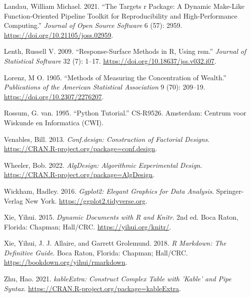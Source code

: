 \documentclass{article}
\newlength{\cslhangindent}
\newlength{\cslentryspacingunit} %
\newenvironment{CSLReferences}[2] %
 {%
  \setlength{\parindent}{0pt}
  \ifodd #1
  \let\oldpar\par
  \def\par{\hangindent=\cslhangindent\oldpar}
  \fi
  \setlength{\parskip}{#2\cslentryspacingunit}
 }%
 {}
\begin{document}
\begin{CSLReferences}{1}{0}
\leavevmode{}%
Landau, William Michael. 2021. {``The Targets r Package: A Dynamic
Make-Like Function-Oriented Pipeline Toolkit for Reproducibility and
High-Performance Computing.''} \emph{Journal of Open Source Software} 6
(57): 2959. \url{https://doi.org/10.21105/joss.02959}.

\leavevmode{}%
Lenth, Russell V. 2009. {``Response-Surface Methods in {R}, Using
{rsm}.''} \emph{Journal of Statistical Software} 32 (7): 1--17.
\url{https://doi.org/10.18637/jss.v032.i07}.

\leavevmode{}%
Lorenz, M O. 1905. {``Methods of Measuring the Concentration of
Wealth.''} \emph{Publications of the American Statistical Association} 9
(70): 209--19. \url{https://doi.org/10.2307/2276207}.

\leavevmode{}%
Rossum, G. van. 1995. {``Python Tutorial.''} CS-R9526. Amsterdam:
Centrum voor Wiskunde en Informatica (CWI).

\leavevmode{}%
Venables, Bill. 2013. \emph{Conf.design: Construction of Factorial
Designs}. \url{https://CRAN.R-project.org/package=conf.design}.

\leavevmode{}%
Wheeler, Bob. 2022. \emph{AlgDesign: Algorithmic Experimental Design}.
\url{https://CRAN.R-project.org/package=AlgDesign}.

\leavevmode{}%
Wickham, Hadley. 2016. \emph{Ggplot2: Elegant Graphics for Data
Analysis}. Springer-Verlag New York.
\url{https://ggplot2.tidyverse.org}.

\leavevmode{}%
Xie, Yihui. 2015. \emph{Dynamic Documents with {R} and Knitr}. 2nd ed.
Boca Raton, Florida: Chapman; Hall/CRC. \url{https://yihui.org/knitr/}.

\leavevmode{}%
Xie, Yihui, J. J. Allaire, and Garrett Grolemund. 2018. \emph{R
Markdown: The Definitive Guide}. Boca Raton, Florida: Chapman; Hall/CRC.
\url{https://bookdown.org/yihui/rmarkdown}.

\leavevmode{}%
Zhu, Hao. 2021. \emph{kableExtra: Construct Complex Table with 'Kable'
and Pipe Syntax}. \url{https://CRAN.R-project.org/package=kableExtra}.

\end{CSLReferences}



\end{document}
